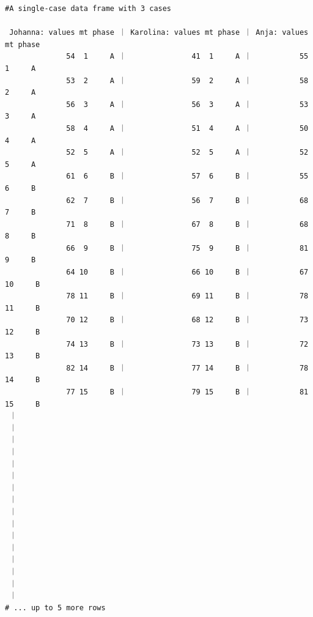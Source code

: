 \documentclass[
  letterpaper,
  DIV=11,
  numbers=noendperiod]{scrreprt}
\begin{document}
\begin{verbatim}
#A single-case data frame with 3 cases

 Johanna: values mt phase ｜ Karolina: values mt phase ｜ Anja: values mt phase
              54  1     A ｜               41  1     A ｜           55  1     A
              53  2     A ｜               59  2     A ｜           58  2     A
              56  3     A ｜               56  3     A ｜           53  3     A
              58  4     A ｜               51  4     A ｜           50  4     A
              52  5     A ｜               52  5     A ｜           52  5     A
              61  6     B ｜               57  6     B ｜           55  6     B
              62  7     B ｜               56  7     B ｜           68  7     B
              71  8     B ｜               67  8     B ｜           68  8     B
              66  9     B ｜               75  9     B ｜           81  9     B
              64 10     B ｜               66 10     B ｜           67 10     B
              78 11     B ｜               69 11     B ｜           78 11     B
              70 12     B ｜               68 12     B ｜           73 12     B
              74 13     B ｜               73 13     B ｜           72 13     B
              82 14     B ｜               77 14     B ｜           78 14     B
              77 15     B ｜               79 15     B ｜           81 15     B
 ｜
 ｜
 ｜
 ｜
 ｜
 ｜
 ｜
 ｜
 ｜
 ｜
 ｜
 ｜
 ｜
 ｜
 ｜
 ｜
# ... up to 5 more rows
\end{verbatim}
\end{document}

